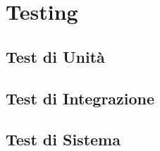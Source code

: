 \documentclass[a4paper,12pt]{article}
\begin{document}
\newpage
    \section{Testing}
        \subsection{Test di Unità}

        \subsection{Test di Integrazione}

        \subsection{Test di Sistema}
\end{document}
